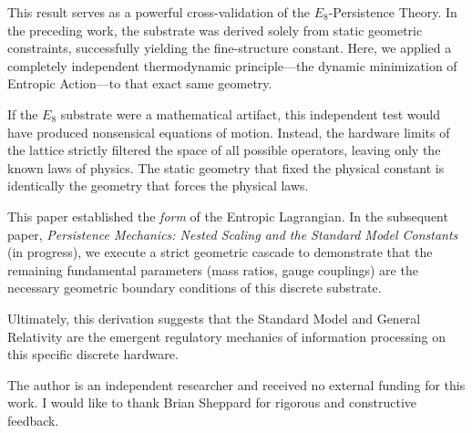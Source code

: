This result serves as a powerful cross-validation of the $E_8$-Persistence Theory. In the preceding work, the substrate was derived solely from static geometric constraints, successfully yielding the fine-structure constant. Here, we applied a completely independent thermodynamic principle—the dynamic minimization of Entropic Action—to that exact same geometry. 

If the $E_8$ substrate were a mathematical artifact, this independent test would have produced nonsensical equations of motion. Instead, the hardware limits of the lattice strictly filtered the space of all possible operators, leaving only the known laws of physics. The static geometry that fixed the physical constant is identically the geometry that forces the physical laws.

This paper established the \textit{form} of the Entropic Lagrangian. In the subsequent paper, \textit{Persistence Mechanics: Nested Scaling and the Standard Model Constants} (in progress), we execute a strict geometric cascade to demonstrate that the remaining fundamental parameters (mass ratios, gauge couplings) are the necessary geometric boundary conditions of this discrete substrate.

Ultimately, this derivation suggests that the Standard Model and General Relativity are the emergent regulatory mechanics  of information processing on this specific discrete hardware.

\begin{acknowledgments}
The author is an independent researcher and received no external funding for this work. I would like to thank Brian Sheppard for rigorous and constructive feedback.
\end{acknowledgments}